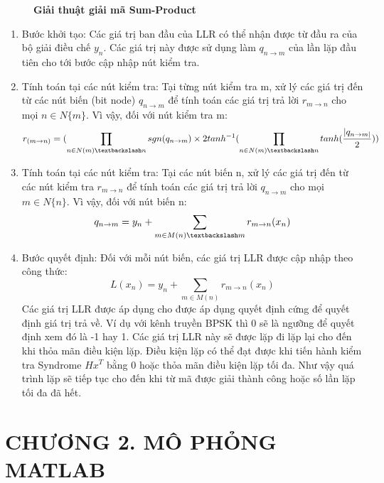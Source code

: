 \documentclass{article}
\begin{document}
\begin{itemize}
\begin{figure}[H]
    \caption[Giải thuật giải mã Sum-Product ]{\bfseries\fontsize{12pt}{0pt} \selectfont Giải thuật giải mã Sum-Product} %
    \label{hinh17}
\end{figure}
    \begin{enumerate}
    \item 	Bước khởi tạo: Các giá trị ban đầu của LLR có thể nhận được từ đầu ra của bộ giải điều chế $y_n$. Các giá trị này được sử dụng làm $q_{n\to m}$  của lần lặp đầu tiên cho tới bước cập nhập nút kiểm tra.
    \item 	Tính toán tại các nút kiểm tra: Tại từng nút kiểm tra m, xử lý các giá trị đến từ các nút biến (bit node) $q_{n\to m}$ để tính toán các giá trị trả lời $r_{m\to n}$ cho mọi $n \in N\{m\}$. Vì vậy, đối với nút kiểm tra m:
       \begin{equation}\label{135}
           r_{(m \to n)} =  (\prod_{n \in N(m) \textbackslash n} sgn(q_{n \to m}) \times 2tanh^{-1}(\prod_{n \in N(m) \textbackslash n}tanh(\frac{|q_{n \to m|}}{2}))
       \end{equation}
    \item 	Tính toán tại các nút kiểm tra: Tại các nút biến n, xử lý các giá trị đến từ các nút kiểm tra  $r_{m\to n}$ để tính toán các giá trị trả lời $q_{n\to m}$  cho mọi $m \in N\{n\}$. Vì vậy, đối với nút biến n:
       \begin{equation}\label{136}
           q_{n \to m} = y_n+ \sum_{m \in M(n) \textbackslash m} r_{m \to n}(x_n)
       \end{equation}
    \item Bước quyết định: Đối với mỗi nút biến, các giá trị LLR được cập nhập theo công thức:
       \begin{equation}\label{137}
           L(x_n ) = y_n+ \sum_{m \in M(n)} r_{m \to n}(x_n)
       \end{equation}
      	Các giá trị LLR được áp dụng cho được áp dụng quyết định cứng để quyết định giá trị trả về. Ví dụ với kênh truyền BPSK thì 0 sẽ là ngưỡng để quyết định xem đó là -1 hay 1. Các giá trị LLR này sẽ được lặp đi lặp lại cho đến khi thỏa mãn điều kiện lặp. Điều kiện lặp có thể đạt được khi tiến hành kiểm tra Syndrome $Hx^T$ bằng 0 hoặc thỏa mãn điều kiện lặp tối đa. Như vậy quá trình lặp sẽ tiếp tục cho đến khi từ mã được giải thành công hoặc số lần lặp tối đa đã hết.

    \end{enumerate}
\end{itemize}
\cleardoublepage
\section*{CHƯƠNG 2. MÔ PHỎNG MATLAB}
\setcounter{section}{2}
\setcounter{subsection}{0}
\setcounter{figure}{0}
\setcounter{table}{0}
\end{document}
